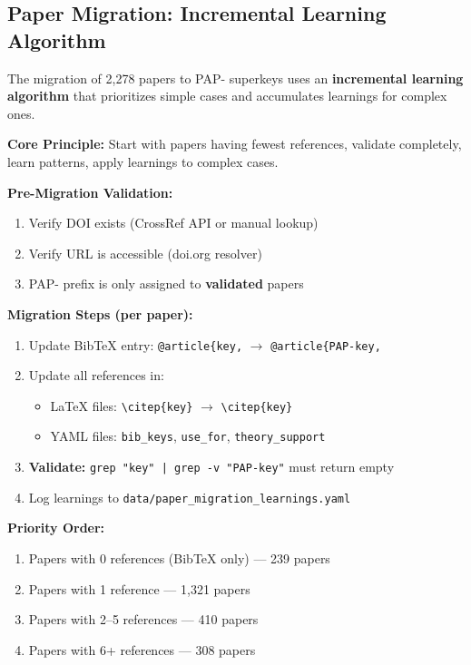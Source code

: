 \subsection{Paper Migration: Incremental Learning Algorithm}
\label{sec:paper-migration-algorithm}

The migration of 2,278 papers to PAP- superkeys uses an \textbf{incremental learning
algorithm} that prioritizes simple cases and accumulates learnings for complex ones.

\begin{tcolorbox}[colback=yellow!5!white, colframe=yellow!75!black,
    title=Paper Migration Algorithm (Incremental Learning)]

\textbf{Core Principle:} Start with papers having fewest references, validate completely,
learn patterns, apply learnings to complex cases.

\textbf{Pre-Migration Validation:}
\begin{enumerate}[nosep]
    \item Verify DOI exists (CrossRef API or manual lookup)
    \item Verify URL is accessible (doi.org resolver)
    \item PAP- prefix is only assigned to \textbf{validated} papers
\end{enumerate}

\textbf{Migration Steps (per paper):}
\begin{enumerate}[nosep]
    \item Update BibTeX entry: \texttt{@article\{key,} $\rightarrow$ \texttt{@article\{PAP-key,}
    \item Update all references in:
    \begin{itemize}[nosep]
        \item LaTeX files: \verb|\citep{key}| $\rightarrow$ \verb|\citep{key}|
        \item YAML files: \texttt{bib\_keys}, \texttt{use\_for}, \texttt{theory\_support}
    \end{itemize}
    \item \textbf{Validate:} \texttt{grep "key" | grep -v "PAP-key"} must return empty
    \item Log learnings to \texttt{data/paper\_migration\_learnings.yaml}
\end{enumerate}

\textbf{Priority Order:}
\begin{enumerate}[nosep]
    \item Papers with 0 references (BibTeX only) --- 239 papers
    \item Papers with 1 reference --- 1,321 papers
    \item Papers with 2--5 references --- 410 papers
    \item Papers with 6+ references --- 308 papers
\end{enumerate}


\end{tcolorbox}
